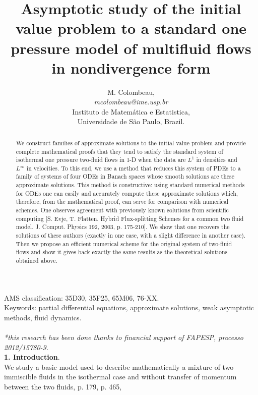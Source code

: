 \documentclass[a4paper,12pt]{article}
\title{Asymptotic  study of the initial value problem to a standard one pressure model of  multifluid flows in nondivergence form}
\author{M. Colombeau,\\ \textit{mcolombeau@ime.usp.br}\\
 Instituto de Matem\'atica e Estatistica,\\Universidade  de S\~ao Paulo, Brazil.}
\begin{document}
\maketitle


\begin {abstract}  We construct families of approximate solutions to the initial value problem and provide complete mathematical proofs that they tend to satisfy the standard system of isothermal one pressure two-fluid flows in 1-D when the data are $L^1$ in densities and $L^\infty$ in velocities. To this end, we use a method that reduces this system of PDEs to a family of systems of four ODEs in Banach spaces whose smooth solutions are these approximate solutions. This method is constructive: using standard numerical methods for ODEs one can easily and accurately compute these approximate solutions which, therefore, from the mathematical proof, can serve for comparison with numerical schemes. One observes agreement with previously known solutions from scientific computing [S. Evje, T. Flatten. Hybrid Flux-splitting Schemes for a common two fluid model. J. Comput. Physics 192, 2003, p. 175-210]. We show that one recovers the solutions of these authors (exactly in one case, with a slight difference in another case). Then we propose an efficient numerical scheme for the original system of two-fluid flows and show it gives back exactly the same results as the theoretical solutions obtained above. \\

\end{abstract}
AMS classification:  35D30, 35F25, 65M06,  76-XX.\\
Keywords:   partial differential equations,  approximate solutions, weak asymptotic methods, fluid dynamics.\\
\\
\textit{*this research has been  done thanks to  financial support of FAPESP, processo 2012/15780-9.}\\




\textbf{1.  Introduction}.\\ 
We study a basic model  used to describe mathematically a mixture of two immiscible fluids in the isothermal case and without transfer of momentum between the two fluids,   \cite{EvjeFlatten}  p. 179, \cite{Cortes} p. 465, 
  
\end{document}
